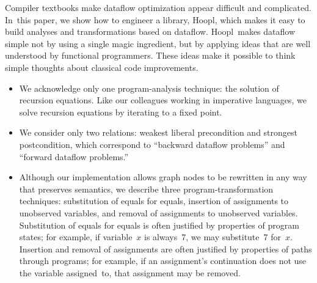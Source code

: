 \documentclass[blockstyle,preprint,natbib,nocopyrightspace]{sigplanconf}
\newcommand\ourlib{Hoopl}  %
\let\cite\citep
\def\authornote#1{\unskip\relax}
\newcommand{\simon}[1]{\authornote{SLPJ: #1}}
\newcommand{\norman}[1]{\authornote{NR: #1}}
\let\remark\norman
\def\finalremark#1{\relax}
\newcommand\secref[1]{Section~\ref{sec:#1}}
\begin{document}
Compiler textbooks make dataflow optimization appear
difficult and complicated.
In~this paper, we show how to engineer a library, \ourlib, which makes
it easy to build analyses and transformations based on dataflow.
\ourlib\ makes dataflow simple not by using a single magic
ingredient, but by applying ideas that are well understood by functional
programmers. %
These ideas
make it possible 
to think simple thoughts about classical code improvements.
\simon{It would be good to give cross-refs to plces in the paper that
substantiate these claims.}
\begin{itemize}
\item
We acknowledge only one program-analysis technique: the solution of
recursion equations.
Like our colleagues working in imperative languages, we solve
recursion equations by iterating to a fixed point.
\item
We consider only two
relations: weakest liberal precondition and strongest 
postcondition, which
 correspond 
to
``backward dataflow problems'' and ``forward dataflow
problems.''\finalremark
{Can we give an example of a property of program states which is
neither, just by way of contrast; ie this we cannot do.}
\item
Although our implementation allows graph nodes to be rewritten in any
way that preserves semantics, we describe
three program-transformation techniques:
substitution of equals for equals, 
insertion of assignments to unobserved variables, 
and removal of assignments to unobserved variables. 
Substitution of equals for equals is often justified by properties of program
states; for example, if variable~$x$
is always~7, we may substitute~7 for~$x$.\finalremark
{We can also justify substitution of \emph{labels} in goto
  statements by reasoning about continuations.  This is
  probably not the place to mention this fact.}
Insertion and removal of assignments are often justified by properties
of paths through programs;
for example, if an assignment's continuation does not use the variable
assigned~to, that assignment may be removed.


\end{itemize}
\end{document}
